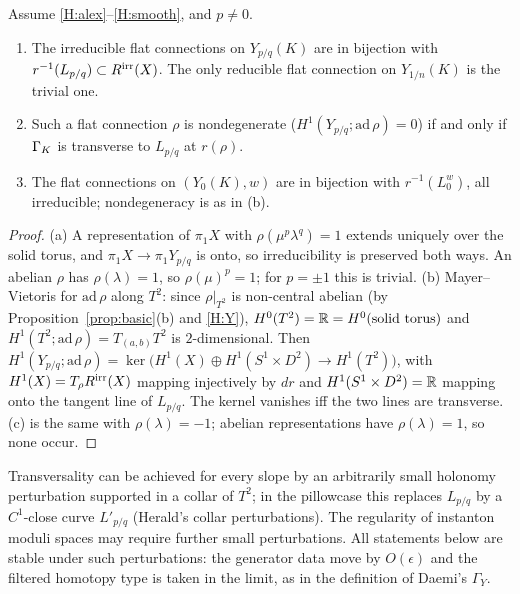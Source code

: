 \begin{proposition}[generators]\label{prop:gens}
Assume \ref{H:alex}--\ref{H:smooth}, and $p\neq0$.
\begin{enumerate}[label=(\alph*)]
\item The irreducible flat connections on $Y_{p/q}(K)$ are in bijection with $r^{-1}(L_{p/q})\subset R^{\rm irr}(X)$.
The only reducible flat connection on $Y_{1/n}(K)$ is the trivial one.
\item Such a flat connection $\rho$ is nondegenerate ($H^1(Y_{p/q};\mathrm{ad}\,\rho)=0$) if and only if $\Gamma_K$ is
transverse to $L_{p/q}$ at $r(\rho)$.
\item The flat connections on $(Y_0(K),w)$ are in bijection with $r^{-1}(L^w_0)$, all irreducible; nondegeneracy is
as in (b).
\end{enumerate}
\end{proposition}
\begin{proof}
(a) A representation of $\pi_1X$ with $\rho(\mu^p\lambda^q)=1$ extends uniquely over the solid torus, and
$\pi_1X\to\pi_1Y_{p/q}$ is onto, so irreducibility is preserved both ways.  An abelian $\rho$ has $\rho(\lambda)=1$, so
$\rho(\mu)^p=1$; for $p=\pm1$ this is trivial.  (b) Mayer--Vietoris for $\mathrm{ad}\,\rho$ along $T^2$: since
$\rho|_{T^2}$ is non-central abelian (by Proposition~\ref{prop:basic}(b) and \ref{H:Y}),
$H^0(T^2)=\mathbb{R}=H^0(\text{solid torus})$ and $H^1(T^2;\mathrm{ad}\,\rho)=T_{(a,b)}T^2$ is $2$-dimensional.  Then
$H^1(Y_{p/q};\mathrm{ad}\,\rho)=\ker\big(H^1(X)\oplus H^1(S^1\times D^2)\to H^1(T^2)\big)$, with $H^1(X)=T_\rho R^{\rm irr}(X)$
mapping injectively by $dr$ and $H^1(S^1\times D^2)=\mathbb{R}$ mapping onto the tangent line of $L_{p/q}$.  The kernel
vanishes iff the two lines are transverse.  (c) is the same with $\rho(\lambda)=-1$; abelian representations have
$\rho(\lambda)=1$, so none occur.
\end{proof}

\begin{remark}
Transversality can be achieved for every slope by an arbitrarily small holonomy perturbation supported in a collar
of $T^2$; in the pillowcase this replaces $L_{p/q}$ by a $C^1$-close curve $L'_{p/q}$ (Herald's collar
perturbations).  The regularity of instanton moduli spaces may require further small perturbations.  All statements
below are stable under such perturbations: the generator data move by $O(\epsilon)$ and the filtered homotopy type
is taken in the limit, as in the definition of Daemi's $\Gamma_Y$.
\end{remark}
